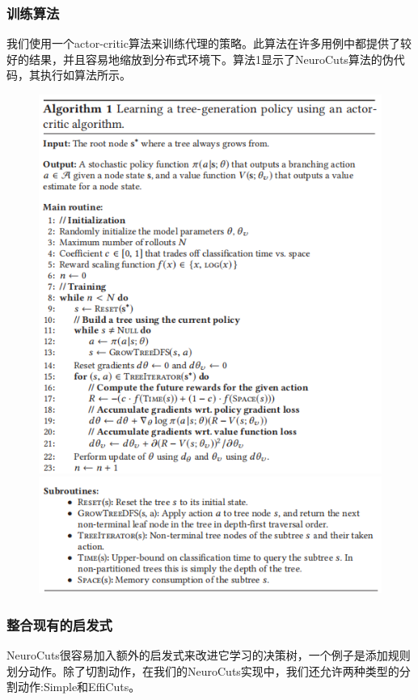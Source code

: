 \documentclass[UTF8,a4paper]{ctexart}
\begin{document}
\subsubsection{训练算法}
我们使用一个actor-critic算法来训练代理的策略。此算法在许多用例中都提供了较好的结果，并且容易地缩放到分布式环境下。算法1显示了NeuroCuts算法的伪代码，其执行如算法所示。
\begin{figure}[H]
    \centering
    \includegraphics[width = \textwidth]{image005.png}
    \includegraphics[width = \textwidth]{image007.png}
\end{figure}
\subsubsection{整合现有的启发式}
NeuroCuts很容易加入额外的启发式来改进它学习的决策树，一个例子是添加规则划分动作。除了切割动作，在我们的NeuroCuts实现中，我们还允许两种类型的分割动作:Simple和EffiCuts。
\end{document}
